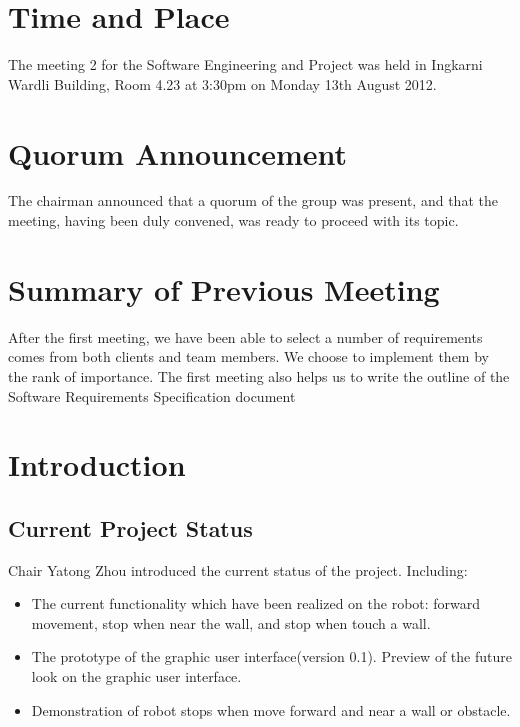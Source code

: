 \documentclass[11pt, a4paper]{article}
\begin{document}
\section{Time and Place}
The meeting 2 for the Software Engineering and Project was held in Ingkarni Wardli Building, Room 4.23 at 3:30pm on Monday 13th August 2012.

\section{Quorum Announcement}
The chairman announced that a quorum of the group was present, and that the meeting, having been duly convened, was ready to proceed with its topic.

\section{Summary of Previous Meeting}
After the first meeting, we have been able to select a number of requirements comes from both clients and team members. We choose to implement them by the rank of importance. 
The first meeting also helps us to write the outline of the Software Requirements Specification document

\section{Introduction}

\subsection{Current Project Status}
Chair Yatong Zhou introduced the current status of the project. Including: 
\begin{itemize} 
\item The current functionality which have been realized on the robot: forward movement, stop when near the wall, and stop when touch a wall.
\item The prototype of the graphic user interface(version 0.1). Preview of the future look on the graphic user interface. 
\item Demonstration of robot stops when move forward and near a wall or obstacle. 
\end{itemize}
\end{document}
